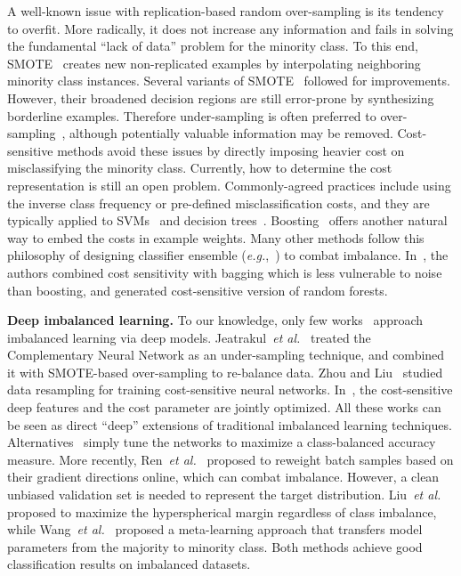 \documentclass[10pt,journal,compsoc]{IEEEtran}
\newcommand{\etal}{\emph{et al.}}
\newcommand{\eg}{\emph{e.g.}}
\begin{document}
A well-known issue with replication-based random over-sampling is its tendency to overfit. More radically, it does not increase any information and fails in solving the fundamental ``lack of data'' problem for the minority class. To this end, SMOTE~\cite{Chawla02} creates new non-replicated examples by interpolating neighboring minority class instances. Several variants of SMOTE~\cite{Han05,Maciejewski11,He08adasyn} followed for improvements. However, their broadened decision regions are still error-prone by synthesizing borderline examples. Therefore under-sampling is often preferred to over-sampling~\cite{Drummond03}, although potentially valuable information may be removed. Cost-sensitive methods avoid these issues by directly imposing heavier cost on misclassifying the minority class. Currently, how to determine the cost representation is still an open problem. Commonly-agreed practices include using the inverse class frequency or pre-defined misclassification costs, and they are typically applied to SVMs~\cite{Tang09} and decision trees~\cite{Zhou2006AAAI}. Boosting~\cite{Ting00} offers another natural way to embed the costs in example weights. Many other methods follow this philosophy of designing classifier ensemble (\eg,~\cite{Chen16,KRAWCZYK2014554}) to combat imbalance. In~\cite{Chen16,KRAWCZYK2014554}, the authors combined cost sensitivity with bagging which is less vulnerable to noise than boosting, and generated cost-sensitive version of random forests.

\noindent
{\bf Deep imbalanced learning.} To our knowledge, only few works~\cite{Jeatrakul10,Khan18,Castro13,zhou2006training,Wang16IJCNN,NG2016875,NIPS2017_7278,Dong_2017_ICCV} approach imbalanced learning via deep models. Jeatrakul~\etal~\cite{Jeatrakul10} treated the Complementary Neural Network as an under-sampling technique, and combined it with SMOTE-based over-sampling to re-balance data. Zhou and Liu~\cite{zhou2006training} studied data resampling for training cost-sensitive neural networks. In~\cite{Khan18,Castro13}, the cost-sensitive deep features and the cost parameter are jointly optimized. All these works can be seen as direct ``deep'' extensions of traditional imbalanced learning techniques. Alternatives~\cite{Wang16IJCNN,NG2016875} simply tune the networks to maximize a class-balanced accuracy measure. More recently, Ren~\etal~\cite{RenZYU18} proposed to reweight batch samples based on their gradient directions online, which can combat imbalance. However, a clean unbiased validation set is needed to represent the target distribution. Liu~\etal~\cite{LiuNIPS18} proposed to maximize the hyperspherical margin regardless of class imbalance, while Wang~\etal~\cite{NIPS2017_7278} proposed a meta-learning approach that transfers model parameters from the majority to minority class. Both methods achieve good classification results on imbalanced datasets.
\end{document}
